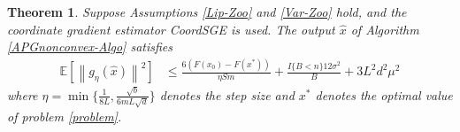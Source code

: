 \documentclass{article}
\newcommand*{\E}{\mathbb{E}}
\newcommand{\norm}[1]{\left\lVert#1\right\rVert}
\newtheorem{theorem}{Theorem}[section]
\theoremstyle{definition}
\theoremstyle{remark}
\begin{document}
\begin{theorem}\label{noncon-zoo}
Suppose Assumptions \ref{Lip-Zoo} and \ref{Var-Zoo} hold, and the coordinate gradient estimator CoordSGE is used. The output $\hat{x}$ of Algorithm \ref{APGnonconvex-Algo} satisfies
  \begin{equation}\label{noncon-zoo-main}
  \begin{split}
\E[\norm{g_{\eta}(\hat{x})}^2] & \leq \frac{6\left(F(x_0) - F({x}^*)\right)}{\eta Sm} + \frac{I\{B < n\}12\sigma ^2}{B}+3{L^2 d^2 \mu^2}
\end{split}
 \end{equation}
where $\eta = \min\{\frac{1}{8L}, \frac{\sqrt{b}}{6mL\sqrt{d}}\}$ denotes the step size and $x^*$ denotes the optimal value of problem \ref{problem}.
\end{theorem}
\end{document}
